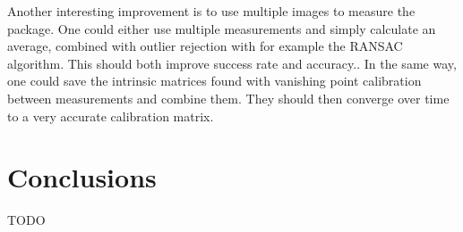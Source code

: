 Another interesting improvement is to use multiple images to measure the package.
One could either use multiple measurements and simply calculate an average, combined with outlier rejection with for example the RANSAC algorithm.
This should both improve success rate and accuracy..
In the same way, one could save the intrinsic matrices found with vanishing point calibration between measurements and combine them.
They should then converge over time to a very accurate calibration matrix. \cite{fischler1981random}


\section{Conclusions}
TODO









